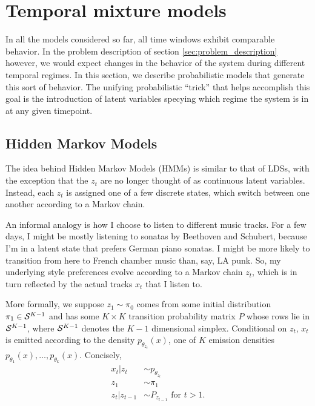 \documentclass{article}
\begin{document}
\section{Temporal mixture models}
\label{sec:temporal_mixture_models}

In all the models considered so far, all time windows exhibit comparable
behavior. In the problem description of section \ref{sec:problem_description}
however, we would expect changes in the behavior of the system during different
temporal regimes. In this section, we describe probabilistic models that
generate this sort of behavior. The unifying probabilistic ``trick'' that helps
accomplish this goal is the introduction of latent variables specying which
regime the system is in at any given timepoint.

\subsection{Hidden Markov Models}
\label{subsec:hmms}

The idea behind Hidden Markov Models (HMMs) is similar to that of LDSs, with the
exception that the $z_{t}$ are no longer thought of as continuous latent
variables. Instead, each $z_{t}$ is assigned one of a few discrete states,
which switch between one another according to a Markov chain.

An informal analogy is how I choose to listen to different music tracks. For a
few days, I might be mostly listening to sonatas by Beethoven and Schubert,
because I'm in a latent state that prefers German piano sonatas. I might be more
likely to transition from here to French chamber music than, say, LA punk. So,
my underlying style preferences evolve according to a Markov chain $z_{t}$,
which is in turn reflected by the actual tracks $x_{t}$ that I listen to.

More formally, we suppose $z_{1} \sim \pi_{0}$ comes from some initial
distribution $\pi_{1} \in \mathcal{S}^{K - 1}$ and has some $K \times K$ transition
probability matrix $P$ whose rows lie in $\mathcal{S}^{K - 1}$, where $\mathcal{S}^{K
  - 1}$ denotes the $K - 1$ dimensional simplex. Conditional on $z_{t}$, $x_{t}$
is emitted according to the density $p_{\theta_{z_{t}}}\left(x\right)$, one of
$K$ emission densities $p_{\theta_{1}}\left(x\right), \dots,
p_{\theta_{k}}\left(x\right)$. Concisely,
\begin{align*}
  x_{t} \vert z_{t} &\sim p_{\theta_{z_{t}}} \\
  z_{1} &\sim \pi_{1} \\
  z_{t} \vert z_{t - 1} &\sim P_{z_{t - 1}} \text{ for } t > 1.
\end{align*}
\end{document}
